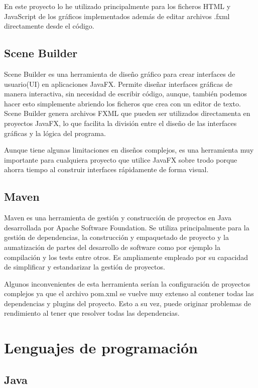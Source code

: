 En este proyecto lo he utilizado principalmente para los ficheros HTML y JavaScript de los gráficos implementados además de editar archivos .fxml directamente desde el código.

\subsection{Scene Builder}

Scene Builder es una herramienta de diseño gráfico para crear interfaces de usuario(UI) en aplicaciones JavaFX. Permite diseñar interfaces gráficas de manera interactiva, sin necesidad de escribir código, aunque, también podemos hacer esto simplemente abriendo los ficheros que crea con un editor de texto. Scene Builder genera archivos FXML que pueden ser utilizados directamenta en proyectos JavaFX, lo que facilita la división entre el diseño de las interfaces gráficas y la lógica del programa.

Aunque tiene algunas limitaciones en diseños complejos, es una herramienta muy importante para cualquiera proyecto que utilice JavaFX sobre trodo porque ahorra tiempo al construir interfaces rápidamente de forma visual. 

\subsection{Maven}

Maven es una herramienta de gestión y construcción de proyectos en Java desarrollada por Apache Software Foundation. Se utiliza principalmente para la gestión de dependencias, la construcción y empaquetado de proyecto y la aumatización de partes del desarrollo de software como por ejemplo la compilación y los tests entre otros. Es ampliamente empleado por su capacidad de simplificar y estandarizar la gestión de proyectos.

Algunos inconvenientes de esta herramienta serían la configuración de proyectos complejos ya que el archivo pom.xml se vuelve muy extenso al contener todas las dependencias y plugins del proyecto. Esto a su vez, puede originar problemas de rendimiento al tener que resolver todas las dependencias.

\section{Lenguajes de programación}

\subsection{Java}

